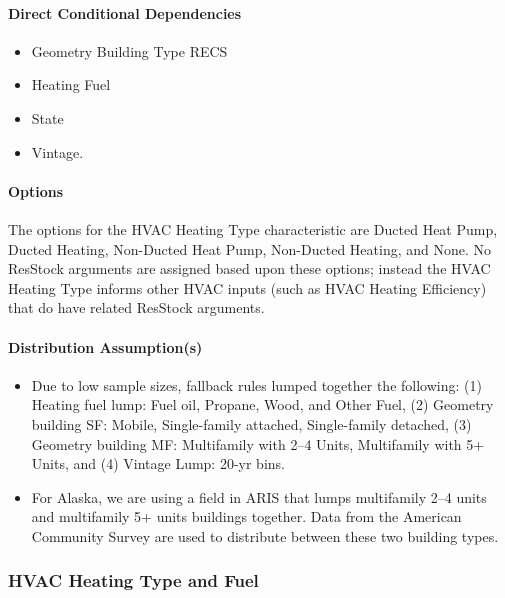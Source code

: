 \paragraph{Direct Conditional Dependencies}
\begin{itemize}
    \item Geometry Building Type RECS
    \item Heating Fuel
    \item State
    \item Vintage.
\end{itemize}

\paragraph{Options} %
The options for the HVAC Heating Type characteristic are Ducted Heat Pump, Ducted Heating, Non-Ducted Heat Pump, Non-Ducted Heating, and None. No ResStock arguments are assigned based upon these options; instead the HVAC Heating Type informs other HVAC inputs (such as HVAC Heating Efficiency) that do have related ResStock arguments.

\paragraph{Distribution Assumption(s)}
\begin{itemize}
    \item Due to low sample sizes, fallback rules lumped together the following: (1) Heating fuel lump: Fuel oil, Propane, Wood, and Other Fuel, (2) Geometry building SF: Mobile, Single-family attached, Single-family detached, (3) Geometry building MF: Multifamily with 2--4 Units, Multifamily with 5+ Units, and (4) Vintage Lump: 20-yr bins.
    \item For Alaska, we are using a field in ARIS that lumps multifamily 2--4 units and multifamily 5+ units buildings together. Data from the American Community Survey are used to distribute between these two building types.
\end{itemize}
  
\subsubsection{HVAC Heating Type and Fuel}
